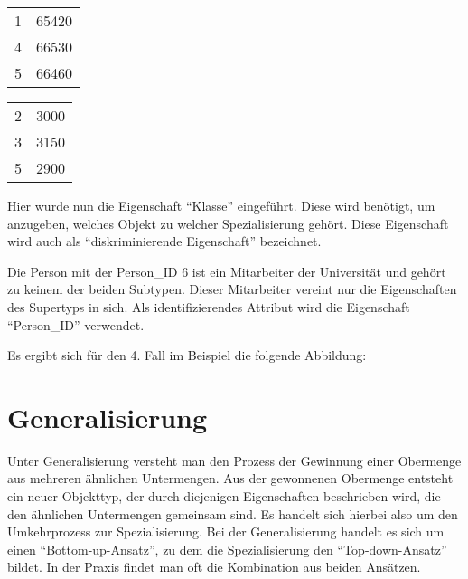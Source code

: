 \clearpage
{}
\begin{supertabular}[h]{lp{5cm}}
    1 & 65420\\
    4 & 66530\\
    5 & 66460\\
\end{supertabular}
\begin{supertabular}[h]{lp{5cm}}
    2 & 3000\\
    3 & 3150\\
    5 & 2900\\
\end{supertabular}

Hier wurde nun die Eigenschaft \enquote{Klasse} eingeführt. Diese wird benötigt, um anzugeben, welches Objekt zu welcher Spezialisierung gehört. Diese Eigenschaft wird auch als \enquote{diskriminierende Eigenschaft} bezeichnet.

Die Person mit der Person\_ID 6 ist ein Mitarbeiter der Universität und gehört zu keinem der beiden Subtypen. Dieser Mitarbeiter vereint nur die Eigenschaften des Supertyps in sich. Als identifizierendes Attribut wird die Eigenschaft \enquote{Person\_ID} verwendet.

Es ergibt sich für den 4. Fall im Beispiel die folgende Abbildung:

\begin{center}
\end{center}
\clearpage
\section{Generalisierung}
Unter Generalisierung versteht man den Prozess der Gewinnung einer Obermenge aus mehreren ähnlichen Untermengen. Aus der gewonnenen Obermenge entsteht ein neuer Objekttyp, der durch diejenigen Eigenschaften beschrieben wird, die den ähnlichen Untermengen gemeinsam sind. Es handelt sich hierbei also um den Umkehrprozess zur Spezialisierung. Bei der Generalisierung handelt es sich um einen \enquote{Bottom-up-Ansatz}, zu dem die Spezialisierung den \enquote{Top-down-Ansatz} bildet. In der Praxis findet man oft die Kombination aus beiden Ansätzen.

